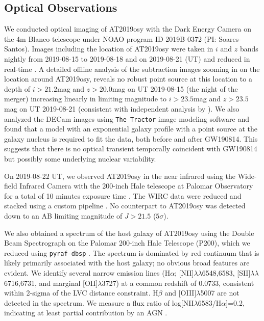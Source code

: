 \subsection{Optical Observations}
\label{subsec:gw190814_optical}
We conducted optical imaging of AT2019osy with the Dark Energy Camera \citep[DECam,][]{Flaugher2015} on the 4m Blanco telescope under NOAO program ID 2019B-0372 (PI: Soares-Santos). Images including the location of AT2019osy were taken in $i$ and $z$ bands nightly from 2019-08-15 to 2019-08-18 and on 2019-08-21 (UT) and reduced in real-time \citep{GoldsteinAndreoni2019}. A detailed offline analysis of the subtraction images zooming in on the location around AT2019osy, reveals no robust point source at this location to a depth of $i>21.2$mag and $z>20.0$mag on UT 2019-08-15 (the night of the merger) increasing linearly in limiting magnitude to  $i > 23.5$mag and $z>23.5$mag on UT 2019-08-21 (consistent with independent analysis by \citealt{GCN25495}). We also analyzed the DECam images using \texttt{The Tractor} image modeling software \citep{Lang2016} and found that a model with an exponential galaxy profile with a point source at the galaxy nucleus is required to fit the data, both before and after GW190814. This suggests that there is no optical transient temporally coincident with GW190814 but possibly some underlying nuclear variability.    

On 2019-08-22 UT, we observed AT2019osy in the near infrared using the Wide-field Infrared Camera \citep[WIRC,][]{Wilson2003} with the 200-inch Hale telescope at Palomar Observatory for a total of 10 minutes exposure time \citep{GCN25449}. The WIRC data were reduced and stacked using a custom pipeline \citep{ 2020PASP..132b5001D}. No counterpart to AT2019osy was detected down to an AB limiting magnitude of $J > 21.5$ ($5 \sigma$).

We also obtained a spectrum of the host galaxy of AT2019osy using the Double Beam Spectrograph \citep{OkeGunn1982} on the Palomar 200-inch Hale Telescope (P200), which we reduced using \texttt{pyraf-dbsp} \citep{pyrafdbsp}. The spectrum is dominated by red continuum that is likely primarily associated with the host galaxy; no obvious broad features are evident. We identify several narrow emission lines (H$\alpha$; [NII]$\lambda \lambda$6548,6583, [SII]$\lambda \lambda$6716,6731, and marginal [OII]$\lambda$3727) at a common redshift of 0.0733, consistent within 2-sigma of the LVC distance constraint.  H$\beta$ and [OIII]$\lambda$5007 are not detected in the spectrum. We measure a flux ratio of log[NII$\lambda$6583/H$\alpha$]=0.2, indicating at least partial contribution by an AGN \citep{Kauffmann+2003}.


